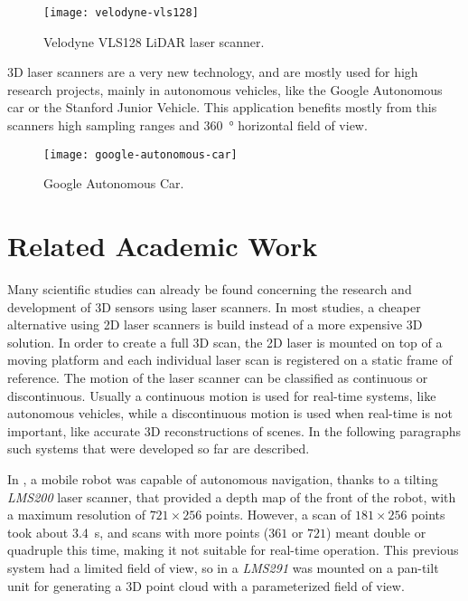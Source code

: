 \begin{figure}[h]
    \centering
    \texttt{[image: velodyne-vls128]}
    \caption{Velodyne VLS128 LiDAR laser scanner.}
    \label{fig:velodyne-vls128}
\end{figure}

3D laser scanners are a very new technology, and are mostly used for high research projects, mainly in autonomous vehicles, like the Google Autonomous car \cite{google-self-driving} or the Stanford Junior Vehicle\cite{montemerlo08}. This application benefits mostly from this scanners high sampling ranges and \SI{360}{\degree} horizontal field of view.

\begin{figure}[h]
    \centering
    \texttt{[image: google-autonomous-car]}
    \caption{Google Autonomous Car.}
    \label{fig:google-autonomous-car}
\end{figure}

\section{Related Academic Work}

Many scientific studies can already be found concerning the research and development of 3D sensors using laser scanners. In most studies, a cheaper alternative using 2D laser scanners is build instead of a more expensive 3D solution. In order to create a full 3D scan, the 2D laser is mounted on top of a moving platform and each individual laser scan is registered on a static frame of reference. The motion of the laser scanner can be classified as continuous or discontinuous. Usually a continuous motion is used for real-time systems, like autonomous vehicles, while a discontinuous motion is used when real-time is not important, like accurate 3D reconstructions of scenes. In the following paragraphs such systems that were developed so far are described.

In \cite{surmann2003}, a mobile robot was capable of autonomous navigation, thanks to a tilting \textit{LMS200} laser scanner, that provided a depth map of the front of the robot, with a maximum resolution of $721\times256$ points. However, a scan of $181\times256$ points took about \SI{3.4}{\second}, and scans with more points ($361$ or $721$) meant double or quadruple this time, making it not suitable for real-time operation. This previous system had a limited field of view, so in \cite{zcai05} a \textit{LMS291} was mounted on a pan-tilt unit for generating a 3D point cloud with a parameterized field of view.

